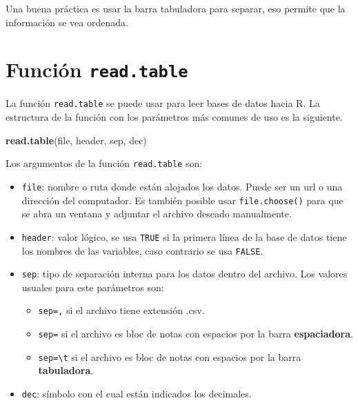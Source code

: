 \documentclass[10pt,]{krantz}
\makeatletter
\newenvironment{Shaded}{\begin{snugshade}}{\end{snugshade}}
\newcommand{\KeywordTok}[1]{\textcolor[rgb]{0.13,0.29,0.53}{\textbf{{#1}}}}
\newcommand{\NormalTok}[1]{{#1}}
\providecommand{\tightlist}{%
  \setlength{\itemsep}{0pt}\setlength{\parskip}{0pt}}
\let\proglang=\textsf
\newenvironment{kframe}{%
\medskip{}
\setlength{\fboxsep}{.8em}
 \def\at@end@of@kframe{}%
 \ifinner\ifhmode%
  \def\at@end@of@kframe{\end{minipage}}%
  \begin{minipage}{\columnwidth}%
 \fi\fi%
 \def\FrameCommand##1{\hskip\@totalleftmargin \hskip-\fboxsep
 \colorbox{shadecolor}{##1}\hskip-\fboxsep
     \hskip-\linewidth \hskip-\@totalleftmargin \hskip\columnwidth}%
 \MakeFramed {\advance\hsize-\width
   \@totalleftmargin\z@ \linewidth\hsize
   \@setminipage}}%
 {\par\unskip\endMakeFramed%
 \at@end@of@kframe}
\renewenvironment{Shaded}{\begin{kframe}}{\end{kframe}}
\let\BeginKnitrBlock\begin \let\EndKnitrBlock\end
\makeatother
\begin{document}
\BeginKnitrBlock{rmdtip}
Una buena práctica es usar la barra tabuladora para separar, eso permite
que la información se vea ordenada.
\EndKnitrBlock{rmdtip}

\section{\texorpdfstring{Función \texttt{read.table}
}{Función read.table }}\label{funcion-read.table}

La función \texttt{read.table} se puede usar para leer bases de datos
hacia \proglang{R}. La estructura de la función con los parámetros más
comunes de uso es la siguiente.

\begin{Shaded}
\begin{Highlighting}[]
\KeywordTok{read.table}\NormalTok{(file, header, sep, dec)}
\end{Highlighting}
\end{Shaded}

Los argumentos de la función \texttt{read.table} son:

\begin{itemize}
\tightlist
\item
  \texttt{file}: nombre o ruta donde están alojados los datos. Puede ser
  un url o una dirección del computador. Es también posible usar
  \texttt{file.choose()} para que se abra un ventana y adjuntar el
  archivo deseado manualmente.
\item
  \texttt{header}: valor lógico, se usa \texttt{TRUE} si la primera
  línea de la base de datos tiene los nombres de las variables, caso
  contrario se usa \texttt{FALSE}.
\item
  \texttt{sep}: tipo de separación interna para los datos dentro del
  archivo. Los valores usuales para este parámetros son:

  \begin{itemize}
  \tightlist
  \item
    \texttt{sep=\textquotesingle{},\textquotesingle{}} si el archivo
    tiene extensión .csv.
  \item
    \texttt{sep=\textquotesingle{}\textquotesingle{}} si el archivo es
    bloc de notas con espacios por la barra \textbf{espaciadora}.
  \item
    \texttt{sep=\textquotesingle{}\textbackslash{}t\textquotesingle{}}
    si el archivo es bloc de notas con espacios por la barra
    \textbf{tabuladora}.
  \end{itemize}
\item
  \texttt{dec}: símbolo con el cual están indicados los decimales.
\end{itemize}
\end{document}
